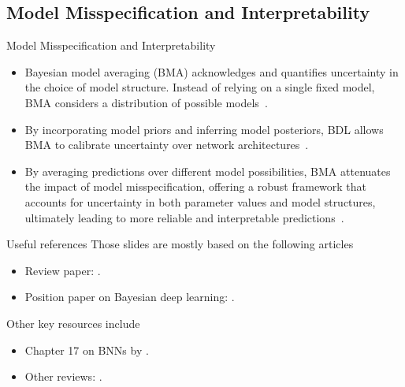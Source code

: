 \documentclass[9pt]{beamer}
\begin{document}
\subsection{Model Misspecification and Interpretability}

\begin{frame}{Model Misspecification and Interpretability}
\begin{itemize}[<+->]
	\item \alert{Bayesian model averaging (BMA)} acknowledges and quantifies uncertainty in the choice of model structure. Instead of relying on a single fixed model, BMA considers a distribution of possible models~\citep{hoeting1998bayesian,hoeting1999bayesian, wasserman2000bayesian}. 
	\item By incorporating model priors and inferring model posteriors, BDL allows BMA to \alert{calibrate uncertainty over network architectures}~\citep{hubin2019combining,skaaret2023sparsifying}. 
	\item By averaging predictions over different model possibilities, BMA \alert{attenuates} the impact of \alert{model misspecification}, offering a robust framework that accounts for uncertainty in both parameter values and model structures, ultimately leading to more \alert{reliable and interpretable predictions}~\citep{hubin2021flexible, wang2023m2ib,bouchiat2023laplace}.
\end{itemize}
\end{frame}



\begin{frame}{Useful references}
Those slides are mostly based on the following articles
\begin{itemize}[<+->]
	\item \alert{Review paper}: \citet{arbel2023primer}.
	\item \alert{Position paper} on Bayesian deep learning: \citet{papamarkou2024position}.
\end{itemize}
Other key resources include
\begin{itemize}[<+->]
	\item \alert{Chapter 17 on BNNs} by \citet{murphy2023probabilisticMLadvanced}.
	\item \alert{Other reviews}: \citet{jospin2020hands,abdar2021review,goan2020bayesian,fortuin2021priors,ashukha2020pitfalls,band2021benchmarking,nado2021uncertainty}.
\end{itemize}
\end{frame}
	
\end{document}

